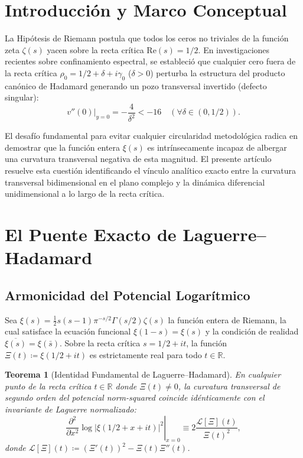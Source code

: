 \documentclass[11pt,a4paper]{article}
\newtheorem{theorem}{Teorema}[section]
\theoremstyle{definition}
\theoremstyle{remark}
\begin{document}
\section{Introducción y Marco Conceptual}

La Hipótesis de Riemann postula que todos los ceros no triviales de la función zeta $\zeta(s)$ yacen sobre la recta crítica $\mathrm{Re}(s) = 1/2$. En investigaciones recientes sobre confinamiento espectral, se estableció que cualquier cero fuera de la recta crítica $\rho_0 = 1/2 + \delta + i\gamma_0$ ($\delta > 0$) perturba la estructura del producto canónico de Hadamard generando un pozo transversal invertido (defecto singular):
\begin{equation}
v''(0)\Big|_{y=0} = -\frac{4}{\delta^2} < -16 \quad (\forall \delta \in (0, 1/2)).
\end{equation}

El desafío fundamental para evitar cualquier circularidad metodológica radica en demostrar que la función entera $\xi(s)$ es intrínsecamente incapaz de albergar una curvatura transversal negativa de esta magnitud. El presente artículo resuelve esta cuestión identificando el vínculo analítico exacto entre la curvatura transversal bidimensional en el plano complejo y la dinámica diferencial unidimensional a lo largo de la recta crítica.

\section{El Puente Exacto de Laguerre--Hadamard}

\subsection{Armonicidad del Potencial Logarítmico}

Sea $\xi(s) = \frac{1}{2} s(s - 1) \pi^{-s/2} \Gamma(s/2) \zeta(s)$ la función entera de Riemann, la cual satisface la ecuación funcional $\xi(1 - s) = \xi(s)$ y la condición de realidad $\overline{\xi(s)} = \xi(\bar{s})$. Sobre la recta crítica $s = 1/2 + it$, la función $\Xi(t) \coloneqq \xi(1/2 + it)$ es estrictamente real para todo $t \in \mathbb{R}$.

\begin{theorem}[Identidad Fundamental de Laguerre--Hadamard]
En cualquier punto de la recta crítica $t \in \mathbb{R}$ donde $\Xi(t) \neq 0$, la curvatura transversal de segundo orden del potencial norm-squared coincide idénticamente con el invariante de Laguerre normalizado:
\begin{equation}
\left.\frac{\partial^2}{\partial x^2}\log |\xi(1/2 + x + it)|^2\right|_{x=0} \equiv 2 \frac{\mathcal{L}[\Xi](t)}{\Xi(t)^2},
\end{equation}
donde $\mathcal{L}[\Xi](t) \coloneqq (\Xi'(t))^2 - \Xi(t)\Xi''(t)$.
\end{theorem}
\end{document}
